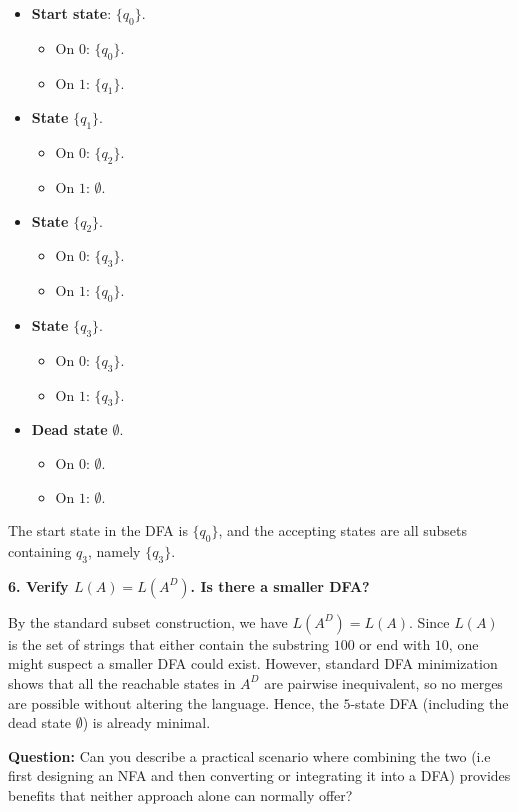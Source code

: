 \documentclass{article}
\theoremstyle{theorem}
\theoremstyle{definition}
\theoremstyle{remark}
\begin{document}
\begin{itemize}
\item \textbf{Start state}: $\{q_0\}$. 
  \begin{itemize}
  \item On $0$: $\{q_0\}$.
  \item On $1$: $\{q_1\}$.
  \end{itemize}
\item \textbf{State} $\{q_1\}$.
  \begin{itemize}
  \item On $0$: $\{q_2\}$.
  \item On $1$: $\emptyset$.
  \end{itemize}
\item \textbf{State} $\{q_2\}$.
  \begin{itemize}
  \item On $0$: $\{q_3\}$.
  \item On $1$: $\{q_0\}$.
  \end{itemize}
\item \textbf{State} $\{q_3\}$.
  \begin{itemize}
  \item On $0$: $\{q_3\}$.
  \item On $1$: $\{q_3\}$.
  \end{itemize}
\item \textbf{Dead state} $\emptyset$.
  \begin{itemize}
  \item On $0$: $\emptyset$.
  \item On $1$: $\emptyset$.
  \end{itemize}
\end{itemize}

The start state in the DFA is $\{q_0\}$, and the accepting states are 
all subsets containing $q_3$, namely $\{q_3\}$.

\textbf{6. Verify $L(A) = L(A^D)$. Is there a smaller DFA?}

By the standard subset construction, we have $L(A^D) = L(A)$. 
Since $L(A)$ is the set of strings that either contain the substring $100$ or end with $10$, 
one might suspect a smaller DFA could exist. However, standard DFA 
minimization shows that all the reachable states in $A^D$ are pairwise 
inequivalent, so no merges are possible without altering the language. 
Hence, the $5$-state DFA (including the dead state $\emptyset$) is already minimal.

\textbf{Question:} Can you describe a practical scenario where combining the two (i.e first designing an NFA and then converting or integrating it into a DFA) provides benefits that neither approach alone can normally offer?
\end{document}
